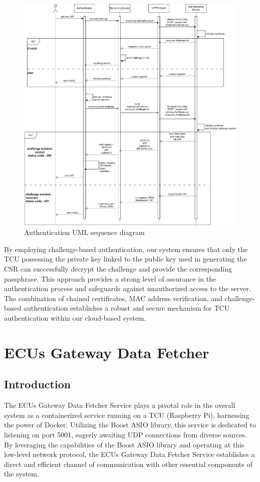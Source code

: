 \documentclass[
12pt,
oneside, 
onehalfspacing, 
nolistspacing, 
parskip, 
chapterinoneline, 
]{AASTCOMPUTER}
\begin{document}
\begin{figure}[!ht]
\centering
\includegraphics[scale=0.33]{Figures/26.png}
\caption[Authentication UML sequence diagram]{Authentication UML sequence diagram}
\label{fig:TCU}
\end{figure}

\clearpage

By employing challenge-based authentication, our system ensures that only the TCU possessing the private key linked to the public key used in generating the CSR can successfully decrypt the challenge and provide the corresponding passphrase. This approach provides a strong level of assurance in the authentication process and safeguards against unauthorized access to the server. The combination of chained certificates, MAC address verification, and challenge-based authentication establishes a robust and secure mechanism for TCU authentication within our cloud-based system.




\section{ECUs Gateway Data Fetcher}
\subsection{Introduction}
The ECUs Gateway Data Fetcher Service plays a pivotal role in the overall system as a containerized service running on a TCU (Raspberry Pi), harnessing the power of Docker. Utilizing the Boost ASIO library, this service is dedicated to listening on port 5001, eagerly awaiting UDP connections from diverse sources. By leveraging the capabilities of the Boost ASIO library and operating at this low-level network protocol, the ECUs Gateway Data Fetcher Service establishes a direct and efficient channel of communication with other essential components of the system.
\end{document}
